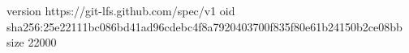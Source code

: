 version https://git-lfs.github.com/spec/v1
oid sha256:25e22111bc086bd41ad96cdebc4f8a7920403700f835f80e61b24150b2ce08bb
size 22000
